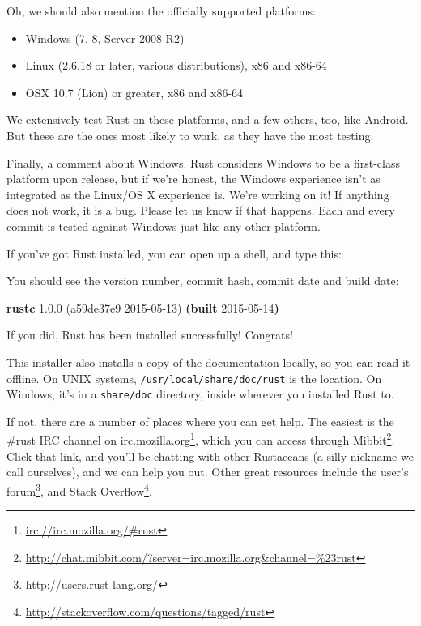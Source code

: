 \documentclass[a4paper,]{book}
\newenvironment{Shaded}{\begin{snugshade}}{\end{snugshade}}
\newcommand{\KeywordTok}[1]{\textcolor[rgb]{0.13,0.29,0.53}{\textbf{{#1}}}}
\newcommand{\NormalTok}[1]{{#1}}
\renewcommand{\href}[2]{#2\footnote{\url{#1}}}
\begin{document}
Oh, we should also mention the officially supported platforms:

\begin{itemize}
\itemsep1pt\parskip0pt
\item
  Windows (7, 8, Server 2008 R2)
\item
  Linux (2.6.18 or later, various distributions), x86 and x86-64
\item
  OSX 10.7 (Lion) or greater, x86 and x86-64
\end{itemize}

We extensively test Rust on these platforms, and a few others, too, like
Android. But these are the ones most likely to work, as they have the
most testing.

Finally, a comment about Windows. Rust considers Windows to be a
first-class platform upon release, but if we're honest, the Windows
experience isn't as integrated as the Linux/OS X experience is. We're
working on it! If anything does not work, it is a bug. Please let us
know if that happens. Each and every commit is tested against Windows
just like any other platform.

If you've got Rust installed, you can open up a shell, and type this:

\begin{Shaded}
\end{Shaded}

You should see the version number, commit hash, commit date and build
date:

\begin{Shaded}
\begin{Highlighting}[]
\KeywordTok{rustc} \NormalTok{1.0.0 (a59de37e9 2015-05-13) }\KeywordTok{(built} \NormalTok{2015-05-14}\KeywordTok{)}
\end{Highlighting}
\end{Shaded}

If you did, Rust has been installed successfully! Congrats!

This installer also installs a copy of the documentation locally, so you
can read it offline. On UNIX systems, \texttt{/usr/local/share/doc/rust}
is the location. On Windows, it's in a \texttt{share/doc} directory,
inside wherever you installed Rust to.

If not, there are a number of places where you can get help. The easiest
is \href{irc://irc.mozilla.org/\#rust}{the \#rust IRC channel on
irc.mozilla.org}, which you can access through
\href{http://chat.mibbit.com/?server=irc.mozilla.org\&channel=\%23rust}{Mibbit}.
Click that link, and you'll be chatting with other Rustaceans (a silly
nickname we call ourselves), and we can help you out. Other great
resources include \href{http://users.rust-lang.org/}{the user's forum},
and \href{http://stackoverflow.com/questions/tagged/rust}{Stack
Overflow}.
\end{document}
